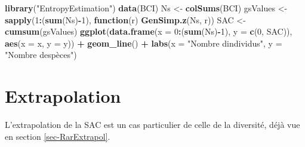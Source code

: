\documentclass[
  11pt,
  french,
  a4paper,
  extrafontsizes,onecolumn,openright
  ]{memoir}
\newenvironment{Shaded}{\begin{snugshade}}{\end{snugshade}}
\newcommand{\AttributeTok}[1]{\textcolor[rgb]{0.13,0.29,0.53}{#1}}
\newcommand{\ControlFlowTok}[1]{\textcolor[rgb]{0.13,0.29,0.53}{\textbf{#1}}}
\newcommand{\DecValTok}[1]{\textcolor[rgb]{0.00,0.00,0.81}{#1}}
\newcommand{\FunctionTok}[1]{\textcolor[rgb]{0.13,0.29,0.53}{\textbf{#1}}}
\newcommand{\NormalTok}[1]{#1}
\newcommand{\OtherTok}[1]{\textcolor[rgb]{0.56,0.35,0.01}{#1}}
\newcommand{\SpecialCharTok}[1]{\textcolor[rgb]{0.81,0.36,0.00}{\textbf{#1}}}
\newcommand{\StringTok}[1]{\textcolor[rgb]{0.31,0.60,0.02}{#1}}
\begin{document}
\scriptsize

\begin{Shaded}
\begin{Highlighting}[]
\FunctionTok{library}\NormalTok{(}\StringTok{"EntropyEstimation"}\NormalTok{)}
\FunctionTok{data}\NormalTok{(BCI)}
\NormalTok{Ns }\OtherTok{\textless{}{-}} \FunctionTok{colSums}\NormalTok{(BCI)}
\NormalTok{gsValues }\OtherTok{\textless{}{-}} \FunctionTok{sapply}\NormalTok{(}\DecValTok{1}\SpecialCharTok{:}\NormalTok{(}\FunctionTok{sum}\NormalTok{(Ns)}\SpecialCharTok{{-}}\DecValTok{1}\NormalTok{), }\ControlFlowTok{function}\NormalTok{(r) }\FunctionTok{GenSimp.z}\NormalTok{(Ns, r))}
\NormalTok{SAC }\OtherTok{\textless{}{-}} \FunctionTok{cumsum}\NormalTok{(gsValues)}
\FunctionTok{ggplot}\NormalTok{(}\FunctionTok{data.frame}\NormalTok{(}\AttributeTok{x =} \DecValTok{0}\SpecialCharTok{:}\NormalTok{(}\FunctionTok{sum}\NormalTok{(Ns)}\SpecialCharTok{{-}}\DecValTok{1}\NormalTok{), }
                  \AttributeTok{y =} \FunctionTok{c}\NormalTok{(}\DecValTok{0}\NormalTok{, SAC)), }
       \FunctionTok{aes}\NormalTok{(}\AttributeTok{x =}\NormalTok{ x, }\AttributeTok{y =}\NormalTok{ y)) }\SpecialCharTok{+}
  \FunctionTok{geom\_line}\NormalTok{() }\SpecialCharTok{+}
  \FunctionTok{labs}\NormalTok{(}\AttributeTok{x =} \StringTok{"Nombre d\textquotesingle{}individus"}\NormalTok{, }\AttributeTok{y =} \StringTok{"Nombre d\textquotesingle{}espèces"}\NormalTok{)}
\end{Highlighting}
\end{Shaded}

\normalsize

\section{Extrapolation}\label{sec-Extrapolation}

L'extrapolation de la SAC est un cas particulier de celle de la diversité, déjà vue en section \ref{sec-RarExtrapol}.
\end{document}
